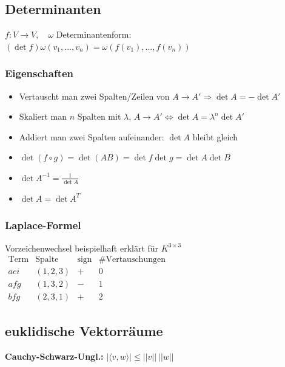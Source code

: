\documentclass[german, fourcolumn, 8pt]{latex4ei/latex4ei_sheet}
\newcommand{\equival}[0]{\ensuremath{\Longleftrightarrow}}
\begin{document}
\subsection{Determinanten}
\begin{sectionbox}
    $f:V \rightarrow V,\quad \omega$ Determinantenform: \\
    $(\det f)\omega(v_1,...,v_n)=\omega(f(v_1), ..., f(v_n))$
    \subsubsection{Eigenschaften}
    \begin{itemize}
        \item Vertauscht man zwei Spalten/Zeilen von $A \rightarrow A' \Longrightarrow \det A = -\det A'$
        \item Skaliert man $n$ Spalten mit $\lambda$, $A \rightarrow A' \equival \det A = \lambda^n \det A'$
        \item Addiert man zwei Spalten aufeinander: $\det A$ bleibt gleich
        \item $\det(f \circ g)=\det (AB)=\det f \det g = \det A \det B$
        \item $\det A^{-1}=\frac{1}{\det A}$
        \item $\det A = \det A^T$
    \end{itemize}
\end{sectionbox}

\subsubsection{Laplace-Formel}
Vorzeichenwechsel beispielhaft erklärt für $K^{3\times 3}$\\
$\begin{array}{c|c|c|c}
        \text{Term} & \text{Spalte} & \text{sign} & \text{\# Vertauschungen} \\ \hline
        aei         & (1,2,3)       & +           & 0                        \\
        afg         & (1,3,2)       & -           & 1                        \\
        bfg         & (2,3,1)       & +           & 2
    \end{array}$

\subsection{euklidische Vektorräume}
\textbf{Cauchy-Schwarz-Ungl.:} $|\langle v,w \rangle| \le ||v|| \: ||w||$
\end{document}
